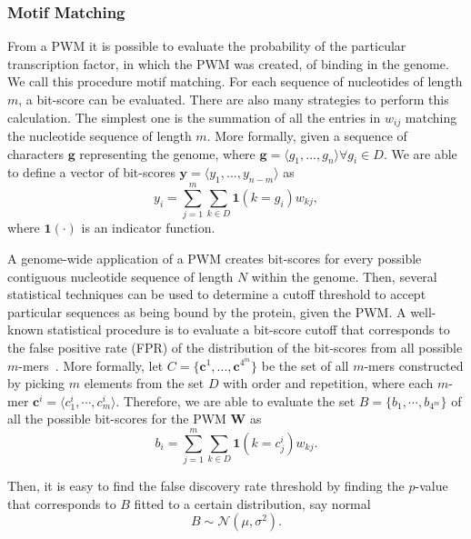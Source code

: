 \subsubsection{Motif Matching}

From a PWM it is possible to evaluate the probability of the particular transcription factor, in which the PWM was created, of binding in the genome. We call this procedure motif matching. For each sequence of nucleotides of length $ m $, a bit-score can be evaluated. There are also many strategies to perform this calculation. The simplest one is the summation of all the entries in $ w_{ij} $ matching the nucleotide sequence of length $ m $. More formally, given a sequence of characters $\mathbf{g}$ representing the genome, where $\mathbf{g} = \langle{g}_{1}, ..., {g}_{n}\rangle \forall {g}_{i} \in D$. We are able to define a vector of bit-scores $\mathbf{y} = \langle{y}_{1}, ..., {y}_{n-m}\rangle$ as
\begin{equation}
  \label{eq:motif.match}
  {y}_{i} = \sum_{j=1}^{m} \sum_{k \in D} {\mathbf{1}}(k={g}_{i}){w}_{kj},
\end{equation}
where ${\mathbf{1}}(\cdot)$ is an indicator function. 

A genome-wide application of a PWM creates bit-scores for every possible contiguous nucleotide sequence of length $ N $ within the genome. Then, several statistical techniques can be used to determine a cutoff threshold to accept particular sequences as being bound by the protein, given the PWM. A well-known statistical procedure is to evaluate a bit-score cutoff that corresponds to the false positive rate (FPR) of the distribution of the bit-scores from all possible $m$-mers~\cite{wilczynski2009}. More formally, let $C = \{\mathbf{c}^{1}, ..., \mathbf{c}^{4^m}\}$ be the set of all $m$-mers constructed by picking $ m $ elements from the set $ D $ with order and repetition, where each $m$-mer $\mathbf{c}^{i} = \langle{c}^{i}_{1}, \cdots, {c}^{i}_{m}\rangle$. Therefore, we are able to evaluate the set $ B = \{ {b}_{1}, \cdots, {b}_{4^m} \} $ of all the possible bit-scores for the PWM $\mathbf{W}$ as
\begin{equation}
  \label{eq:pwm.cutoff1}
  {b}_{i} = \sum_{j=1}^{m} \sum_{k \in D} {\mathbf{1}}(k={c}^{i}_{j}){w}_{kj}.
\end{equation}

Then, it is easy to find the false discovery rate threshold by finding the $p$-value that corresponds to $ B $ fitted to a certain distribution, say normal
\begin{equation}
  \label{eq:pwm.cutoff2}
  B \sim \mathcal{N}({\mu},{\sigma}^{2}).
\end{equation}

